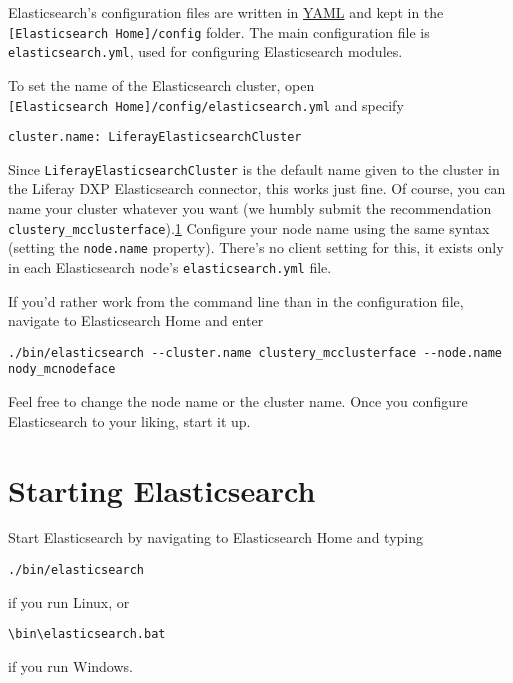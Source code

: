 \noindent\hrulefill

Elasticsearch's configuration files are written in
\href{http://www.yaml.org}{YAML} and kept in the
\texttt{{[}Elasticsearch\ Home{]}/config} folder. The main configuration
file is \texttt{elasticsearch.yml}, used for configuring Elasticsearch
modules.

To set the name of the Elasticsearch cluster, open
\texttt{{[}Elasticsearch\ Home{]}/config/elasticsearch.yml} and specify

\begin{verbatim}
cluster.name: LiferayElasticsearchCluster
\end{verbatim}

Since \texttt{LiferayElasticsearchCluster} is the default name given to
the cluster in the Liferay DXP Elasticsearch connector, this works just
fine. Of course, you can name your cluster whatever you want (we humbly
submit the recommendation
\texttt{clustery\_mcclusterface}).\hyperref[footnote1]{1} Configure your
node name using the same syntax (setting the \texttt{node.name}
property). There's no client setting for this, it exists only in each
Elasticsearch node's \texttt{elasticsearch.yml} file.

If you'd rather work from the command line than in the configuration
file, navigate to Elasticsearch Home and enter

\begin{verbatim}
./bin/elasticsearch --cluster.name clustery_mcclusterface --node.name nody_mcnodeface
\end{verbatim}

Feel free to change the node name or the cluster name. Once you
configure Elasticsearch to your liking, start it up.

\section{Starting Elasticsearch}\label{starting-elasticsearch}

Start Elasticsearch by navigating to Elasticsearch Home and typing

\begin{verbatim}
./bin/elasticsearch
\end{verbatim}

if you run Linux, or

\begin{verbatim}
\bin\elasticsearch.bat
\end{verbatim}

if you run Windows.

